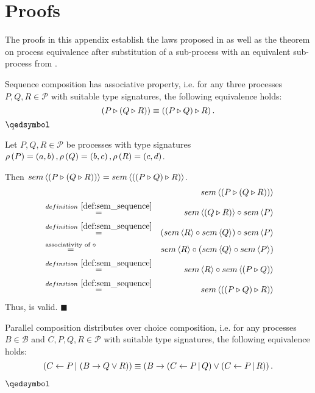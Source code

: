 \chapter{Proofs}
\label{chp:proofs}
The proofs in this appendix establish the laws proposed in  as well as the theorem on process equivalence after substitution of a sub-process with an equivalent sub-process from .

\vfill
\begin{theorem}
\label{thm:associativity_sequence}
Sequence composition has associative property, i.e. for any three processes $P, Q, R \in \mathcal{P}$ with suitable type signatures, the following equivalence holds:
\begin{equation*}
  \left( P \triangleright \left( Q \triangleright R \right) \right) \equiv \left( \left( P \triangleright Q \right) \triangleright R \right).
\end{equation*}
\hfill$\qedsymbol$
\end{theorem}

\begin{myproof}
Let $P, Q, R \in \mathcal{P}$ be processes with type signatures $\rho \left( P \right) = \left( a, b \right), \rho \left( Q \right) = \left( b, c \right), \rho \left( R \right) = \left( c, d \right)$.

Then $sem \left\langle \left( P \triangleright \left( Q \triangleright R \right) \right) \right\rangle = sem \left\langle \left( \left( P \triangleright Q \right) \triangleright R \right) \right\rangle$.
\begin{eqnarray*}
  & & \sem{\sequence{P}{\sequence{Q}{R}}} \\
  & \overset{\defref{def:sem_sequence}}{=} & \sem{\sequence{Q}{R}} \circ \sem{P} \\
  & \overset{\defref{def:sem_sequence}}{=} & \left( \sem{R} \circ \sem{Q} \right) \circ \sem{P} \\
  & \overset{\text{associativity of }\circ}{=} & \sem{R} \circ \left( \sem{Q} \circ \sem{P} \right) \\
  & \overset{\defref{def:sem_sequence}}{=} & \sem{R} \circ \sem{\sequence{P}{Q}} \\
  & \overset{\defref{def:sem_sequence}}{=} & \sem{\sequence{\sequence{P}{Q}}{R}}
\end{eqnarray*}
Thus,  is valid. \hfill$\blacksquare$
\end{myproof}


\clearpage
\begin{theorem}
\label{thm:distributivity_parallel_choice}
Parallel composition distributes over choice composition, i.e. for any processes $B \in \mathcal{B}$ and $C, P, Q, R \in \mathcal{P}$ with suitable type signatures, the following equivalence holds:
\begin{equation*}
  \left( C \gets P \, | \, \left( B \to Q \vee R \right) \right) \equiv \left( B \to \left( C \gets P \, | \, Q \right) \vee \left( C \gets P \, | \, R \right) \right).
\end{equation*}

\vspace*{-1em}
\hfill$\qedsymbol$
\end{theorem}

